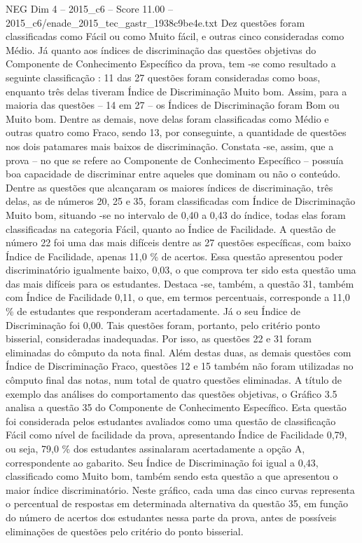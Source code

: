 \begin{textsample}{NEG Dim 4 – 2015\_c6 – Score 11.00 – 2015\_c6/enade\_2015\_tec\_gastr\_1938c9be4e.txt}
Dez questões foram classificadas como Fácil ou como Muito fácil, e outras cinco consideradas como Médio.
Já quanto aos índices de discriminação das questões objetivas do Componente de Conhecimento Específico da prova, tem -se como resultado a seguinte classificação : 11 das 27 questões foram consideradas como boas, enquanto três delas tiveram Índice de Discriminação Muito bom.
Assim, para a maioria das questões – 14 em 27 – os Índices de Discriminação foram Bom ou Muito bom.
Dentre as demais, nove delas foram classificadas como Médio e outras quatro como Fraco, sendo 13, por conseguinte, a quantidade de questões nos dois patamares mais baixos de discriminação.
Constata -se, assim, que a prova – no que se refere ao Componente de Conhecimento Específico – possuía boa capacidade de discriminar entre aqueles que dominam ou não o conteúdo.
Dentre as questões que alcançaram os maiores índices de discriminação, três delas, as de números 20, 25 e 35, foram classificadas com Índice de Discriminação Muito bom, situando -se no intervalo de 0,40 a 0,43 do índice, todas elas foram classificadas na categoria Fácil, quanto ao Índice de Facilidade.
A questão de número 22 foi uma das mais difíceis dentre as 27 questões específicas, com baixo Índice de Facilidade, apenas 11,0 \% de acertos.
Essa questão apresentou poder discriminatório igualmente baixo, 0,03, o que comprova ter sido esta questão uma das mais difíceis para os estudantes.
Destaca -se, também, a questão 31, também com Índice de Facilidade 0,11, o que, em termos percentuais, corresponde a 11,0 \% de estudantes que responderam acertadamente.
Já o seu Índice de Discriminação foi 0,00.
Tais questões foram, portanto, pelo critério ponto bisserial, consideradas inadequadas.
Por isso, as questões 22 e 31 foram eliminadas do cômputo da nota final.
Além destas duas, as demais questões com Índice de Discriminação Fraco, questões 12 e 15 também não foram utilizadas no cômputo final das notas, num total de quatro questões eliminadas.
A título de exemplo das análises do comportamento das questões objetivas, o Gráfico 3.5 analisa a questão 35 do Componente de Conhecimento Específico.
Esta questão foi considerada pelos estudantes avaliados como uma questão de classificação Fácil como nível de facilidade da prova, apresentando Índice de Facilidade 0,79, ou seja, 79,0 \% dos estudantes assinalaram acertadamente a opção A, correspondente ao gabarito.
Seu Índice de Discriminação foi igual a 0,43, classificado como Muito bom, também sendo esta questão a que apresentou o maior índice discriminatório.
Neste gráfico, cada uma das cinco curvas representa o percentual de respostas em determinada alternativa da questão 35, em função do número de acertos dos estudantes nessa parte da prova, antes de possíveis eliminações de questões pelo critério do ponto bisserial.

\end{textsample}
